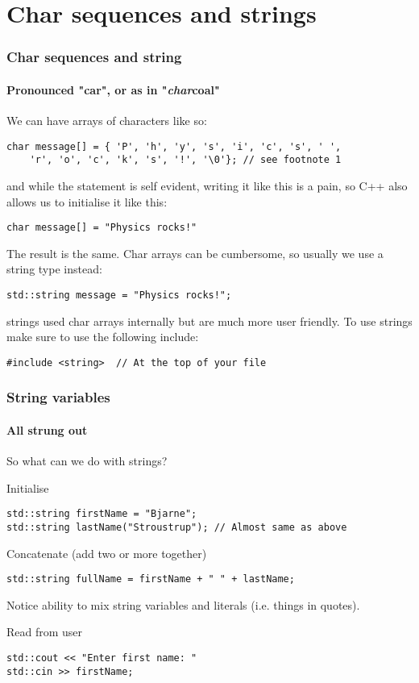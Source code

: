 \documentclass{beamer}
\begin{document}
\section{Char sequences and strings}


\begin{frame}[fragile]
  \frametitle{Char sequences and string}
  \framesubtitle{Pronounced "car", or as in "\textit{char}coal"}
  We can have arrays of characters like so:
  \begin{lstlisting}
char message[] = { 'P', 'h', 'y', 's', 'i', 'c', 's', ' ',
    'r', 'o', 'c', 'k', 's', '!', '\0'}; // see footnote 1
  \end{lstlisting}
  and while the statement is self evident, writing it like this is a pain, so C++ also allows us to initialise it like this:
  \begin{lstlisting}
char message[] = "Physics rocks!"
  \end{lstlisting}
  The result is the same.
  \pause
  Char arrays can be cumbersome, so usually we use a string type instead:
  \begin{lstlisting}
std::string message = "Physics rocks!";
  \end{lstlisting}
  strings used char arrays internally but are much more user friendly.
  To use strings make sure to use the following include:
  \begin{lstlisting}
#include <string>  // At the top of your file
  \end{lstlisting}
\end{frame}

\begin{frame}[fragile]
  \frametitle{String variables}
  \framesubtitle{All strung out}
  So what can we do with strings?
	
  \begin{block}{Initialise}
      \begin{lstlisting}
std::string firstName = "Bjarne";
std::string lastName("Stroustrup"); // Almost same as above
      \end{lstlisting}
  \end{block}
  \pause
  \begin{block}{Concatenate (add two or more together)}
      \begin{lstlisting}
std::string fullName = firstName + " " + lastName;
      \end{lstlisting}
			Notice ability to mix string variables and literals (i.e. things in quotes).      
  \end{block}
  \pause
  \begin{block}{Read from user}
    \begin{lstlisting}
std::cout << "Enter first name: "
std::cin >> firstName;
    \end{lstlisting}
  \end{block}
\end{frame}
\end{document}
